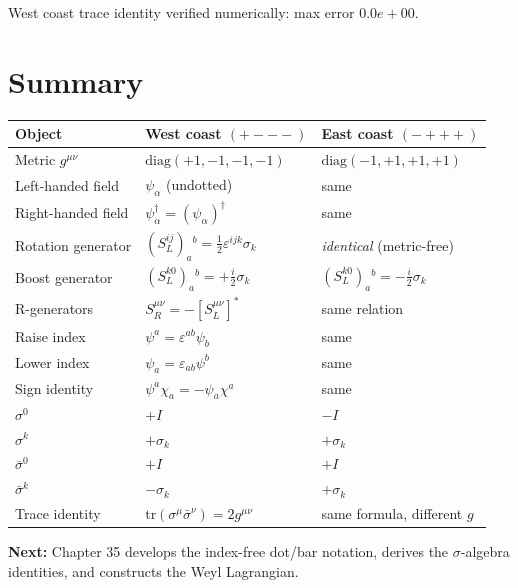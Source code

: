 \documentclass[12pt]{article}
\theoremstyle{remark}
\newcommand{\verified}[1]{\textcolor{verifygreen}{\checkmark\; #1}}
\newcommand{\psidag}{\psi^{\dagger}}
\begin{document}
\verified{West coast trace identity verified numerically: max error $0.0e+00$.}

\section{Summary}

\begin{center}
\renewcommand{\arraystretch}{1.4}
\begin{tabular}{@{}lll@{}}
  \toprule
  Object & West coast $(+{-}{-}{-})$ & East coast $(-{+}{+}{+})$ \\
  \midrule
  Metric $g^{\mu\nu}$ & $\mathrm{diag}(+1,-1,-1,-1)$ & $\mathrm{diag}(-1,+1,+1,+1)$ \\
  Left-handed field & $\psi_\alpha$ (undotted) & same \\
  Right-handed field & $\psidag_{\dot\alpha} = (\psi_\alpha)^\dagger$ & same \\
  Rotation generator & $(S^{ij}_L)_a{}^b = \tfrac{1}{2}\varepsilon^{ijk}\sigma_k$ & \emph{identical} (metric-free) \\
  Boost generator & $(S^{k0}_L)_a{}^b = +\tfrac{i}{2}\sigma_k$ & $(S^{k0}_L)_a{}^b = -\tfrac{i}{2}\sigma_k$ \\
  R-generators & $S^{\mu\nu}_R = -[S^{\mu\nu}_L]^*$ & same relation \\
  Raise index & $\psi^a = \varepsilon^{ab}\psi_b$ & same \\
  Lower index & $\psi_a = \varepsilon_{ab}\psi^b$ & same \\
  Sign identity & $\psi^a\chi_a = -\psi_a\chi^a$ & same \\
  $\sigma^0$ & $+I$ & $-I$ \\
  $\sigma^k$ & $+\sigma_k$ & $+\sigma_k$ \\
  $\bar\sigma^0$ & $+I$ & $+I$ \\
  $\bar\sigma^k$ & $-\sigma_k$ & $+\sigma_k$ \\
  Trace identity & $\mathrm{tr}(\sigma^\mu\bar\sigma^\nu)=2g^{\mu\nu}$ & same formula, different $g$ \\
  \bottomrule
\end{tabular}
\end{center}

\bigskip
\noindent\textbf{Next:} Chapter 35 develops the index-free dot/bar notation,
derives the $\sigma$-algebra identities, and constructs the Weyl Lagrangian.
\end{document}
